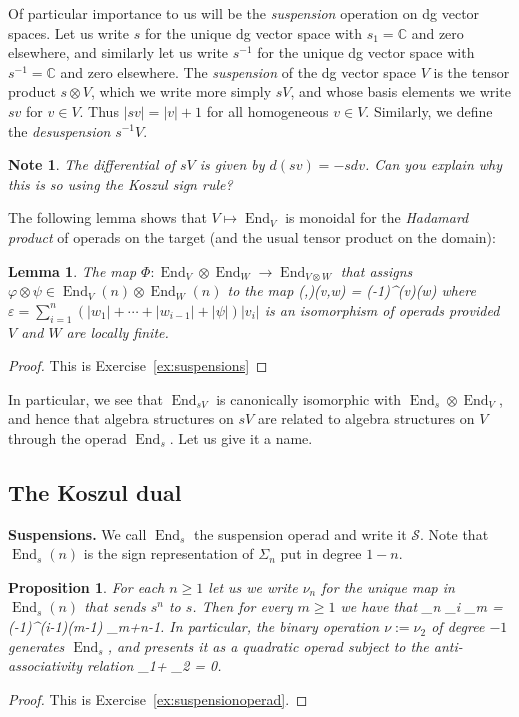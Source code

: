 \documentclass[fleqn, a4paper, twoside]{article}
\makeatletter
\newcommand{\0}{\langle 0\rangle}
\newcommand{\End}{\operatorname{End}}
\let\[\@undefined
\DeclareRobustCommand{\[}{\begin{equation}}%
\let\]\@undefined
\DeclareRobustCommand{\]}{\end{equation}}%
\theoremstyle{mytheorem}
\newtheorem{proposition}[theorem]{Proposition}
\newtheorem{lemma}[theorem]{Lemma}
\theoremstyle{introthm}
\theoremstyle{mydefinition}
\newtheorem{note}[theorem]{Note}
\theoremstyle{mydefinition2}
\theoremstyle{plain} %
\newcommand{\?}{\,?\,}
\theoremstyle{mytheorem}
\theoremstyle{plain} %
\makeatother
\begin{document}
Of particular importance to us will be the \emph{suspension}
operation on dg vector spaces. Let us write $s$ for the
unique dg vector space with $s_1 = \mathbb C$ and zero
elsewhere, and similarly let us write $s^{-1}$ for the
unique dg vector space with $s^{-1} = \mathbb{C}$
and zero elsewhere. The \emph{suspension} of the dg vector
space $V$ is the tensor product $s\otimes V$, which
we write more simply $sV$, and whose basis elements we
write $sv$ for $v\in V$. Thus $|sv| = |v|+1$ for all 
homogeneous $v\in V$. Similarly, we define the
\emph{desuspension} $s^{-1}V$.

\begin{note}
The differential of $sV$ is given by $d(sv) = -s dv$. Can you explain why this is so using
the Koszul sign rule?
\end{note}
 
The following lemma shows that $V\mapsto \End_V$ is 
monoidal for the \emph{Hadamard product} of operads on the
target (and the usual tensor product on the domain): 
 \begin{lemma}\label{lemma:hadamard}
The map $\Phi : \End_V\otimes \End_W\longrightarrow \End_{V\otimes W}$
that assigns $\varphi \otimes \psi \in \End_V(n)\otimes \End_W(n)$
to the map
\[ \Phi(\varphi,\psi)(v,w) = (-1)^\varepsilon \varphi(v)\otimes\psi(w)\]
where $\varepsilon = \sum_{i=1}^n (|w_1| +\cdots + |w_{i-1}|+|\psi|)|v_i|$
is an isomorphism of operads provided $V$ and $W$
are locally finite.
 \end{lemma}
 
 \begin{proof}
 This is Exercise~\ref{ex:suspensions}
 \end{proof}

In particular, we see that $\End_{sV}$ is canonically isomorphic
with $\End_s\otimes \End_V$, and hence that algebra structures on $sV$
are related to algebra structures on $V$ through the operad $\End_s$.
Let us give it a name. 

\subsection{The Koszul dual}

\newcommand{\sus}{\mathscr{S}}
\textbf{Suspensions.} 
We call $\End_{s}$ the suspension operad
and write it $\sus$. Note that $\End_{s}(n)$ is
the sign representation of $\Sigma_n$ put in degree $1-n$.

\begin{proposition} For each $n\geqslant 1$ let us
we write $\nu_n$ for the unique map in $\End_s(n)$ 
that sends $s^n$ to $s$. Then for every $m\geqslant 1$
we have that
\[ \nu_n \circ_i \nu_m = (-1)^{(i-1)(m-1)} \nu_{m+n-1}. \]
In particular, the binary operation $\nu := \nu_2$ of degree
$-1$ generates $\End_s$,
and presents it as a quadratic operad subject to the 
anti-associativity relation
\[ \nu \circ_1\nu + \nu\circ_2 \nu = 0.\]
\end{proposition}
\begin{proof}
 This is Exercise~\ref{ex:suspensionoperad}.
\end{proof}
\end{document}
